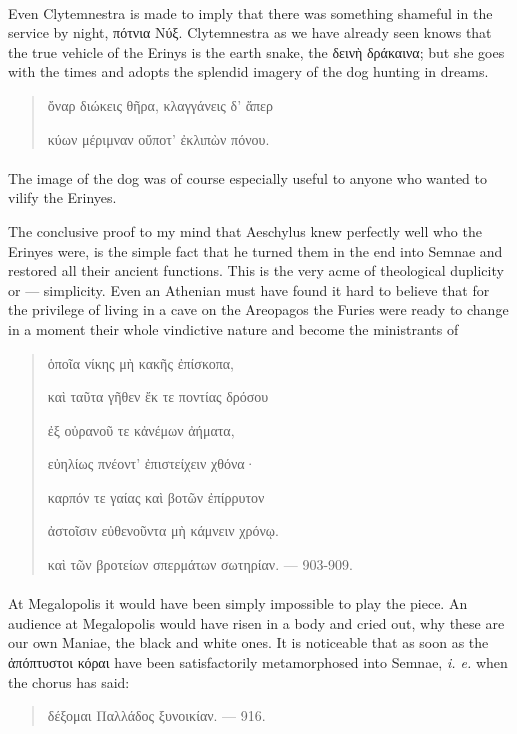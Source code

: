 \documentclass[a4paper, 11pt, oneside, polutonikogreek, english]{article}
\begin{document}
\paragraph{}
Even Clytemnestra is made to imply that there was something shameful in the service by night, πότνια Νύξ. Clytemnestra as we have already seen knows that the true vehicle of the Erinys is the earth snake, the δεινὴ δράκαινα; but she goes with the times and adopts the splendid imagery of the dog hunting in dreams.
\begin{quotation}
ὄναρ διώκεις θῆρα, κλαγγάνεις δ' ἅπερ

κύων μέριμναν οὔποτ' ἐκλιπὼν πόνου.
\end{quotation}
\paragraph{}
The image of the dog was of course especially useful to anyone who wanted to vilify the Erinyes.

The conclusive proof to my mind that Aeschylus knew perfectly well who the Erinyes were, is the simple fact that he turned them in the end into Semnae and restored all their ancient functions. This is the very acme of theological duplicity or --- simplicity. Even an Athenian must have found it hard to believe that for the privilege of living in a cave on the Areopagos the Furies were ready to change in a moment their whole vindictive nature and become the ministrants of
\begin{quotation}
ὁποῖα νίκης μὴ κακῆς ἐπίσκοπα,

καὶ ταῦτα γῆθεν ἔκ τε ποντίας δρόσου

ἐξ οὐρανοῦ τε κἀνέμων ἀήματα,

εὐηλίως πνέοντ' ἐπιστείχειν χθόνα·

καρπόν τε γαίας καὶ βοτῶν ἐπίρρυτον

ἀστοῖσιν εὐθενοῦντα μὴ κάμνειν χρόνῳ.

καὶ τῶν βροτείων σπερμάτων σωτηρίαν. --- 903-909.
\end{quotation}
\paragraph{}
At Megalopolis it would have been simply impossible to play the piece. An audience at Megalopolis would have risen in a body and cried out, why these are our own Maniae, the black and white ones. It is noticeable that as soon as the ἀπόπτυστοι κόραι have been satisfactorily metamorphosed into Semnae, \emph{i. e.} when the chorus has said:
\begin{quotation}
δέξομαι Παλλάδος ξυνοικίαν. --- 916.
\end{quotation}
\end{document}
